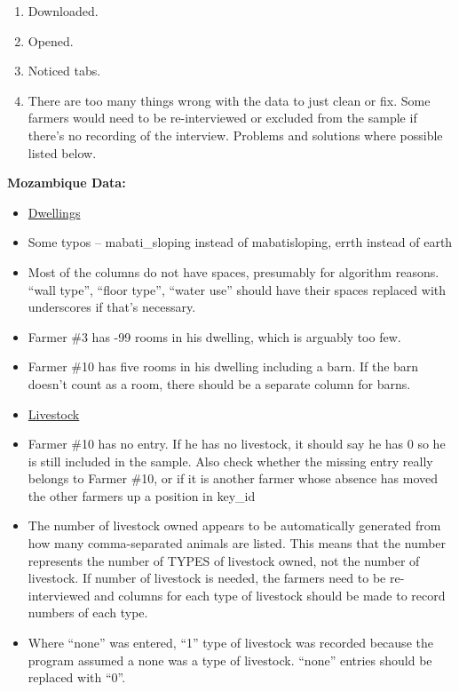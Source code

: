 \documentclass[12pt]{article}
\begin{document}
\begin{enumerate}
    \item Downloaded.
    \item Opened.
    \item Noticed tabs.
    \item There are too many things wrong with the data to just clean or fix. Some farmers would need to be re-interviewed or excluded from the sample if there’s no recording of the interview. Problems and solutions where possible listed below.
\end{enumerate}

\textbf{{Mozambique Data:}}
\begin{itemize}
\renewcommand{\labelitemi}{}
    \item \underline{Dwellings}
\renewcommand{\labelitemi}{$\bullet$}
    \item Some typos – mabati\_sloping instead of mabatisloping, errth instead of earth
    \item Most of the columns do not have spaces, presumably for algorithm reasons. “wall type”, “floor type”, “water use” should have their spaces replaced with underscores if that’s necessary.
    \item Farmer \#3 has -99 rooms in his dwelling, which is arguably too few.
    \item Farmer \#10 has five rooms in his dwelling including a barn. If the barn doesn’t count as a room, there should be a separate column for barns.
\renewcommand{\labelitemi}{}
    \item \underline{Livestock}
\renewcommand{\labelitemi}{$\bullet$}
    \item Farmer \#10 has no entry. If he has no livestock, it should say he has 0 so he is still included in the sample. Also check whether the missing entry really belongs to Farmer \#10, or if it is another farmer whose absence has moved the other farmers up a position in key\_id
    \item The number of livestock owned appears to be automatically generated from how many comma-separated animals are listed. This means that the number represents the number of TYPES of livestock owned, not the number of livestock. If number of livestock is needed, the farmers need to be re-interviewed and columns for each type of livestock should be made to record numbers of each type.
    \item Where “none” was entered, “1” type of livestock was recorded because the program assumed a none was a type of livestock. “none” entries should be replaced with “0”.

\end{itemize}
\end{document}
